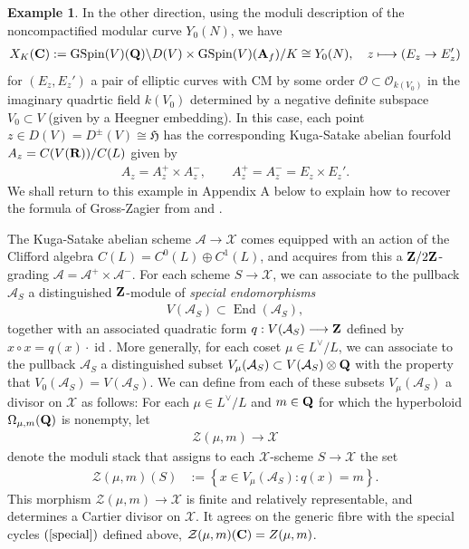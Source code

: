 \documentclass{amsart}
\theoremstyle{definition}
\theoremstyle{definition}
\newtheorem{example}[theorem]{Example}
\theoremstyle{definition}
\begin{document}
\begin{example}
In the other direction, using the moduli description of the noncompactified modular curve $Y_0(N)$, we have 
\begin{align*} X_K({\bf{C}}) := \operatorname{GSpin}(V)({\bf{Q}}) \backslash D(V) \times \operatorname{GSpin}(V)({\bf{A}}_f)/K \cong Y_0(N),
\quad z \longmapsto (E_z \rightarrow E_z') \end{align*}
for $(E_z, E_z')$ a pair of elliptic curves with CM by some order $\mathcal{O} \subset \mathcal{O}_{k(V_0)}$
in the imaginary quadrtic field $k(V_0)$ determined by a negative definite subspace $V_0 \subset V$ (given by a Heegner embedding). 
In this case, each point $z \in D(V) = D^{\pm}(V) \cong \mathfrak{H}$ has the corresponding Kuga-Satake abelian fourfold $A_z = C(V({\bf{R}}))/C(L)$ given by
\begin{align*} A_z = A_z^+ \times A_z^-, \quad \quad A_z^+ = A_z^- = E_z \times E_z'. \end{align*}
We shall return to this example in Appendix A below to explain how to recover the formula of Gross-Zagier \cite[Theorem I (6.3)]{GZ}
from \cite[Theorem 4.7, Theorem 7.7]{BY} and \cite[Theorem A]{AGHMP}. \end{example}

The Kuga-Satake abelian scheme $\mathcal{A} \rightarrow \mathcal{X}$ comes equipped with an action of the Clifford algebra 
$C(L) = C^0(L) \oplus C^1(L)$, and acquires from this a ${\bf{Z}}/2{\bf{Z}}$-grading $\mathcal{A} = \mathcal{A}^+ \times \mathcal{A}^-$.
For each scheme $S \rightarrow \mathcal{X}$, we can associate to the pullback 
$\mathcal{A}_S$ a distinguished ${\bf{Z}}$-module of {\it{special endomorphisms}} 
\begin{align*} V(\mathcal{A}_S) \subset \operatorname{End}(\mathcal{A}_S),\end{align*}
together with an associated quadratic form $q: V(\mathcal{A}_S) \longrightarrow {\bf{Z}}$ defined by $x \circ x = q(x) \cdot \operatorname{id}$.
More generally, for each coset $\mu \in L^{\vee}/L$, we can associate to the pullback $\mathcal{A}_S$ a distinguished
subset $V_{\mu}(\mathcal{A}_S) \subset V(\mathcal{A}_S) \otimes {\bf{Q}}$ with the property that $V_0(\mathcal{A}_S) = V(\mathcal{A}_S)$. 
We can define from each of these subsets $V_{\mu}(\mathcal{A}_S)$ a divisor on $\mathcal{X}$ as follows: 
For each $\mu \in L^{\vee}/L$ and $m \in {\bf{Q}}$ for which the hyperboloid $\Omega_{\mu, m}({\bf{Q}})$ is nonempty, let
\begin{align*} \mathcal{Z}(\mu, m) \longrightarrow \mathcal{X} \end{align*}
denote the moduli stack that assigns to each $\mathcal{X}$-scheme $S \rightarrow \mathcal{X}$ the set 
\begin{align*} \mathcal{Z}(\mu, m)(S) &:= \left\lbrace x\in V_{\mu}(\mathcal{A}_S): q(x) =m \right\rbrace. \end{align*}
This morphism $\mathcal{Z}(\mu, m) \rightarrow \mathcal{X}$ is finite and relatively representable, and determines a Cartier divisor on $\mathcal{X}$. 
It agrees on the generic fibre with the special cycles $(\ref{special})$ defined above, $\mathcal{Z}(\mu, m)({\bf{C}}) = Z(\mu, m)$.
\end{document}
